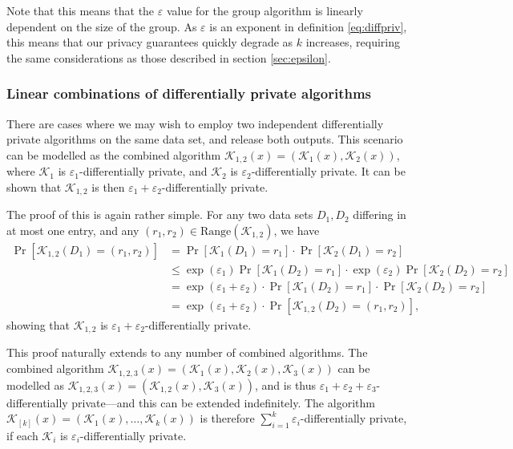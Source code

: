 \documentclass[a4paper,12pt]{article}
\newcommand{\fancy}{\mathcal}
\renewcommand{\epsilon}{\varepsilon}
\begin{document}
Note that this means that the $\epsilon$ value for the group algorithm is linearly dependent on the size of the group. As $\epsilon$ is an exponent in definition \ref{eq:diffpriv}, this means that our privacy guarantees quickly degrade as $k$ increases, requiring the same considerations as those described in section \ref{sec:epsilon}.

\subsubsection{Linear combinations of differentially private algorithms}

There are cases where we may wish to employ two independent differentially private algorithms on the same data set, and release both outputs. This scenario can be modelled as the combined algorithm $\fancy{K}_{1,2}(x)=\left(\fancy{K}_1(x), \fancy{K}_2(x)\right)$, where $\fancy{K}_1$ is $\epsilon_1$-differentially private, and $\fancy{K}_2$ is $\epsilon_2$-differentially private. It can be shown that $\fancy{K}_{1,2}$ is then $\epsilon_1+\epsilon_2$-differentially private.

The proof of this is again rather simple. For any two data sets $D_1,D_2$ differing in at most one entry, and any $(r_1,r_2) \in \text{Range}(\fancy{K}_{1,2})$, we have
\begin{align*}
    \Pr[\fancy{K}_{1,2}(D_1)=(r_1,r_2)] &= \Pr[\fancy{K}_1(D_1)=r_1]\cdot\Pr[\fancy{K}_2(D_1)=r_2] \\
        &\leq \exp(\epsilon_1) \Pr[\fancy{K}_1(D_2)=r_1] \cdot \exp(\epsilon_2) \Pr[\fancy{K}_2(D_2)=r_2] \\
        &= \exp(\epsilon_1 + \epsilon_2) \cdot \Pr[\fancy{K}_1(D_2)=r_1] \cdot \Pr[\fancy{K}_2(D_2)=r_2] \\
        &= \exp(\epsilon_1 + \epsilon_2) \cdot \Pr[\fancy{K}_{1,2}(D_2)=(r_1,r_2)],
\end{align*}
showing that $\fancy{K}_{1,2}$ is $\epsilon_1+\epsilon_2$-differentially private.

This proof naturally extends to any number of combined algorithms. The combined algorithm $\fancy{K}_{1,2,3}(x)=\left(\fancy{K}_1(x), \fancy{K}_2(x), \fancy{K}_3(x) \right)$ can be modelled as $\fancy{K}_{1,2,3}(x)=\left(\fancy{K}_{1,2}(x), \fancy{K}_3(x)\right)$, and is thus $\epsilon_1 + \epsilon_2 + \epsilon_3$-differentially private---and this can be extended indefinitely. The algorithm $\fancy{K}_{[k]}(x)=\left(\fancy{K}_1(x), \dots, \fancy{K}_k(x) \right)$ is therefore $\sum_{i=1}^k \epsilon_i$-differentially private, if each $\fancy{K}_i$ is $\epsilon_i$-differentially private.
\end{document}
